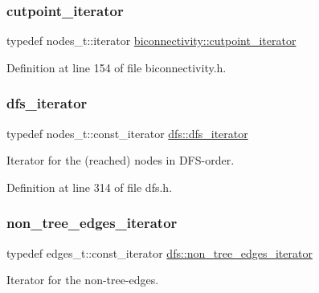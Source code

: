 \subsubsection{\texorpdfstring{cutpoint\+\_\+iterator}{cutpoint\_iterator}}
{\footnotesize\ttfamily typedef nodes\+\_\+t\+::iterator \mbox{\hyperlink{classbiconnectivity_ac9063160d59ab0ea4fa924a68395700b}{biconnectivity\+::cutpoint\+\_\+iterator}}}



Definition at line 154 of file biconnectivity.\+h.

\mbox{\label{classdfs_a15fe023a5a1f7ddda00f3d87110d9a32}} 
\subsubsection{\texorpdfstring{dfs\+\_\+iterator}{dfs\_iterator}}
{\footnotesize\ttfamily typedef nodes\+\_\+t\+::const\+\_\+iterator \mbox{\hyperlink{classdfs_a15fe023a5a1f7ddda00f3d87110d9a32}{dfs\+::dfs\+\_\+iterator}}\hspace{0.3cm}{\ttfamily [inherited]}}



Iterator for the (reached) nodes in D\+F\+S-\/order. 



Definition at line 314 of file dfs.\+h.

\mbox{\label{classdfs_a95e353f354d3b31daded0c4fe749171a}} 
\subsubsection{\texorpdfstring{non\+\_\+tree\+\_\+edges\+\_\+iterator}{non\_tree\_edges\_iterator}}
{\footnotesize\ttfamily typedef edges\+\_\+t\+::const\+\_\+iterator \mbox{\hyperlink{classdfs_a95e353f354d3b31daded0c4fe749171a}{dfs\+::non\+\_\+tree\+\_\+edges\+\_\+iterator}}\hspace{0.3cm}{\ttfamily [inherited]}}



Iterator for the non-\/tree-\/edges. 



